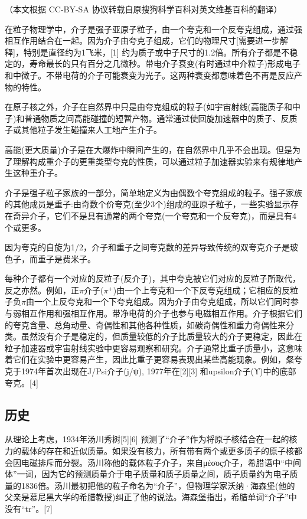
（本文根据 CC-BY-SA 协议转载自原搜狗科学百科对英文维基百科的翻译）

在粒子物理学中，介子是强子亚原子粒子，由一个夸克和一个反夸克组成，通过强相互作用结合在一起。因为介子由夸克子组成，它们的物理尺寸[需要进一步解释]，特别是直径约为1飞米，[1] 约为质子或中子尺寸的1.2倍。所有介子都是不稳定的，寿命最长的只有百分之几微秒。带电介子衰变(有时通过中介粒子)形成电子和中微子。不带电荷的介子可能衰变为光子。这两种衰变都意味着色不再是反应产物的特性。

在原子核之外，介子在自然界中只是由夸克组成的粒子(如宇宙射线(高能质子和中子)和普通物质之间高能碰撞的短暂产物。通常通过使回旋加速器中的质子、反质子或其他粒子发生碰撞来人工地产生介子。

高能(更大质量)介子是在大爆炸中瞬间产生的，在自然界中几乎不会出现。但是为了理解构成重介子的更重类型夸克的性质，可以通过粒子加速器实验来有规律地产生这种重介子。

介子是强子粒子家族的一部分，简单地定义为由偶数个夸克组成的粒子。强子家族的其他成员是重子:由奇数个价夸克(至少3个)组成的亚原子粒子，一些实验显示存在奇异介子，它们不是具有通常的两个夸克(一个夸克和一个反夸克)，而是具有4个或更多。

因为夸克的自旋为1/2，介子和重子之间夸克数的差异导致传统的双夸克介子是玻色子，而重子是费米子。

每种介子都有一个对应的反粒子(反介子)，其中夸克被它们对应的反粒子所取代，反之亦然。例如，正$\pi$介子($\pi^+$)由一个上夸克和一个下反夸克组成；它相应的反粒子负$\pi$由一个上反夸克和一个下夸克组成。因为介子由夸克组成，所以它们同时参与弱相互作用和强相互作用。带净电荷的介子也参与电磁相互作用。介子根据它们的夸克含量、总角动量、奇偶性和其他各种性质，如碳奇偶性和重力奇偶性来分类。虽然没有介子是稳定的，但质量较低的介子比质量较大的介子更稳定，因此在粒子加速器或宇宙射线实验中更容易观察和研究。介子通常比重子质量小，这意味着它们在实验中更容易产生，因此比重子更容易表现出某些高能现象。例如，粲夸克于1974年首次出现在J/Psi介子(j/ψ), 1977年在[2][3] 和upsilon介子(ϒ)中的底部夸克。[4]

\subsection{历史}
从理论上考虑，1934年汤川秀树[5][6] 预测了“介子”作为将原子核结合在一起的核力的载体的存在和近似质量。如果没有核力，所有带有两个或更多质子的原子核都会因电磁排斥而分裂。汤川称他的载体粒子介子，来自μέσος介子，希腊语中“中间体”一词，因为它的预测质量介于电子质量和质子质量之间，质子质量约为电子质量的1836倍。汤川最初把他的粒子命名为“介子”，但物理学家沃纳·海森堡(他的父亲是慕尼黑大学的希腊教授)纠正了他的说法。海森堡指出，希腊单词“介子”中没有“tr”。[7]

